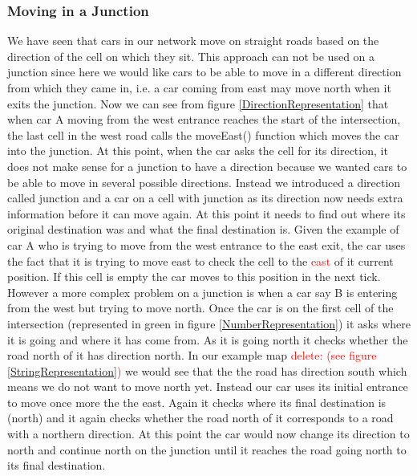 \documentclass{article}
\begin{document}
\subsubsection{Moving in a Junction} 

We have seen that cars in our network move on straight roads based on the direction of the cell on which  they sit. This approach can not be used on a junction since here we would like cars to be able to move in a different direction from which they came in, i.e. a car coming from east may move north when it exits the junction. Now we can see from figure \ref{DirectionRepresentation} that when car A moving from the west entrance reaches the start of the intersection, the last cell in the west road calls the moveEast() function which moves the car into the junction. At this point, when the car asks the cell for its direction, it does not make sense for a junction to have a direction because we wanted cars to be able to move in several possible directions. Instead we introduced a direction called junction and a car on a cell with junction as its direction now needs extra information before it can move again. At this point it needs to find out where its original destination was and what the final destination is. Given the example of car A who is trying to move from the west entrance to the east exit, the car uses the fact that it is trying to move east to check the cell to the \textcolor{red}{east} of it current position. If this cell is empty the car moves to this position in the next tick. However a more complex problem on a junction is when a car say B is entering from the west but trying to move north. Once the car is on the first cell of the intersection (represented in green in figure \ref{NumberRepresentation}) it asks where it is going and where it has come from. As it is going north it checks whether the road north of it has direction north. In our example map \textcolor{red}{delete: (see figure \ref{StringRepresentation})} we would see that the the road has direction south which means we do not want to move north yet. Instead our car uses its initial entrance to move once more the the east. Again it checks where its final destination is (north) and it again checks whether the road north of it corresponds to a road with a northern direction. At this point the car would now change its direction to north and continue north on the junction until it reaches the road going north to its final destination.
\end{document}

